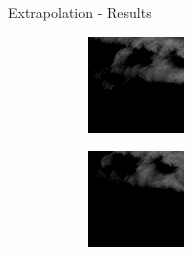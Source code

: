 \documentclass{beamer}
\begin{document}
\begin{frame}{Extrapolation - Results}
	\begin{figure}
	    \begin{subfigure}{.3\textwidth}
	        \centering
	        \includegraphics[width=\linewidth]{fig/extra/3.png}
	    \end{subfigure}
	    \begin{subfigure}{.3\textwidth}
	        \centering
	        \includegraphics[width=\linewidth]{fig/extra/4.png}

\end{subfigure}
\end{figure}
\end{frame}
\end{document}
